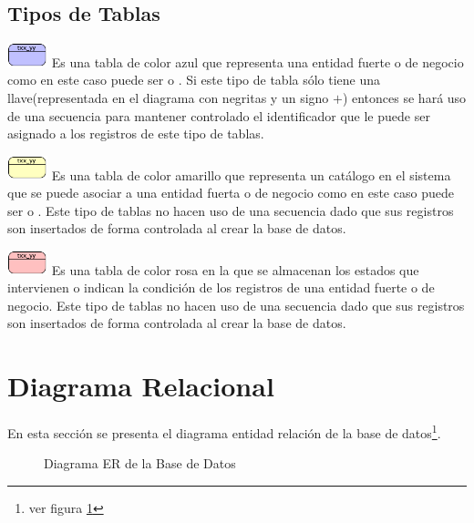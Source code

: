 \subsection{Tipos de Tablas}
	\begin{Citemize}
		\item \includegraphics[height=20pt]{template/img/table} Es una tabla de color azul que representa una entidad fuerte o de negocio como en este caso puede ser  o . Si este tipo de tabla sólo tiene una llave(representada en el diagrama con negritas y un signo $+$) entonces se hará uso de una secuencia para mantener controlado el identificador que le puede ser asignado a los registros de este tipo de tablas.
		\item \includegraphics[height=20pt]{template/img/catalogo} Es una tabla de color amarillo que representa un catálogo en el sistema que se puede asociar a una entidad fuerta o de negocio como en este caso puede ser  o . Este tipo de tablas no hacen uso de una secuencia dado que sus registros son insertados de forma controlada al crear la base de datos.
		\item \includegraphics[height=20pt]{template/img/stateMachine} Es una tabla de color rosa en la que se almacenan los estados que intervienen o indican la condición de los registros de una entidad fuerte o de negocio. Este tipo de tablas no hacen uso de una secuencia dado que sus registros son insertados de forma controlada al crear la base de datos.
	\end{Citemize}


\section{Diagrama Relacional}
En esta sección se presenta el diagrama entidad relación de la base de datos\footnote{ver figura \ref{fig:bd}}.

\begin{figure}[hbtp!]
	\begin{center}
		\caption{Diagrama ER de la Base de Datos}
		\label{fig:bd}
	\end{center}
\end{figure}
